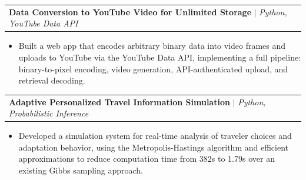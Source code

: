 \documentclass[letterpaper,11pt]{article}
\makeatletter
\newcommand{\resumeItem}[1]{
  \item\small{
    {#1 \vspace{-2pt}}
  }
}
\newcommand{\resumeProjectHeading}[2]{
    \item
    \begin{tabular*}{0.97\textwidth}{l@{\extracolsep{\fill}}r}
      \small#1 & #2 \\
    \end{tabular*}\vspace{-7pt}
}
\newcommand{\resumeItemListStart}{\begin{itemize}[noitemsep, topsep=0pt, parsep=0pt]}
\newcommand{\resumeItemListEnd}{\end{itemize}\vspace{-5pt}}
\makeatother
\begin{document}
  \resumeProjectHeading
    {\textbf{Data Conversion to YouTube Video for Unlimited Storage} $|$ \emph{Python, YouTube Data API}}{}
    \resumeItemListStart
      \resumeItem{Built a web app that encodes arbitrary binary data into video frames and uploads to YouTube via the YouTube Data API, implementing a full pipeline: binary-to-pixel encoding, video generation, API-authenticated upload, and retrieval decoding.}
    \resumeItemListEnd

  \resumeProjectHeading
    {\textbf{Adaptive Personalized Travel Information Simulation} $|$ \emph{Python, Probabilistic Inference}}{}
    \resumeItemListStart
      \resumeItem{Developed a simulation system for real-time analysis of traveler choices and adaptation behavior, using the Metropolis-Hastings algorithm and efficient approximations to reduce computation time from 382s to 1.79s over an existing Gibbs sampling approach.}
    \resumeItemListEnd



\end{document}
